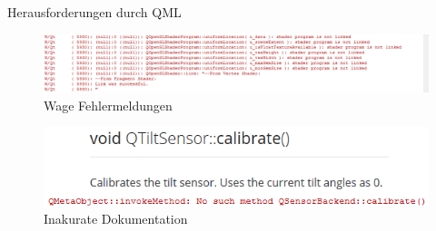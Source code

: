 \begin{frame}{Herausforderungen durch QML}
	\begin{figure}
		\centering
		\includegraphics[width=\textwidth, height=0.2\textheight, keepaspectratio]{images/linkerrorsuccess}
		\caption{Wage Fehlermeldungen}
	\end{figure}
	\begin{figure}
		\centering
		\includegraphics[width=\textwidth, height=0.17\textheight, keepaspectratio]{images/QMLCalibrate}
		 \caption{Inakurate Dokumentation}
	\end{figure}
\end{frame}

